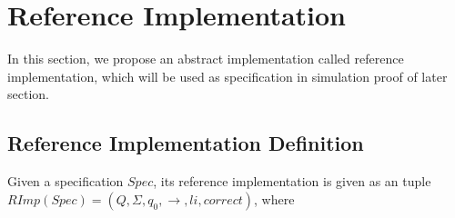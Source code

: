 
\section{Reference Implementation}
\label{sec:reference implementation}

In this section, we propose an abstract implementation called reference implementation, which will be used as specification in simulation proof of later section.


\subsection{Reference Implementation Definition}
\label{subsec:reference implementation definition}

Given a specification $Spec$, its reference implementation is given as an tuple $RImp(Spec) = (Q,\Sigma,q_0,\rightarrow,li,correct)$, where


